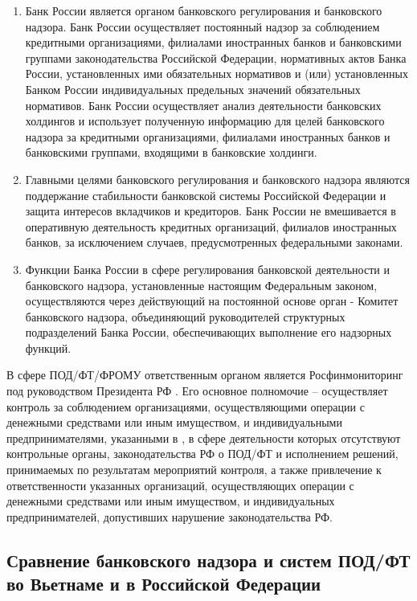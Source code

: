 \documentclass{article}
\begin{document}
\begin{enumerate}
  \item Банк России является органом банковского регулирования и банковского надзора. Банк России осуществляет постоянный надзор за соблюдением кредитными организациями, филиалами иностранных банков и банковскими группами законодательства Российской Федерации, нормативных актов Банка России, установленных ими обязательных нормативов и (или) установленных Банком России индивидуальных предельных значений обязательных нормативов. Банк России осуществляет анализ деятельности банковских холдингов и использует полученную информацию для целей банковского надзора за кредитными организациями, филиалами иностранных банков и банковскими группами, входящими в банковские холдинги.
  \item Главными целями банковского регулирования и банковского надзора являются поддержание стабильности банковской системы Российской Федерации и защита интересов вкладчиков и кредиторов. Банк России не вмешивается в оперативную деятельность кредитных организаций, филиалов иностранных банков, за исключением случаев, предусмотренных федеральными законами.
  \item Функции Банка России в сфере регулирования банковской деятельности и банковского надзора, установленные настоящим Федеральным законом, осуществляются через действующий на постоянной основе орган - Комитет банковского надзора, объединяющий руководителей структурных подразделений Банка России, обеспечивающих выполнение его надзорных функций.
\end{enumerate}

В сфере ПОД/ФТ/ФРОМУ ответственным органом является Росфинмониторинг под руководством Президента РФ \cite{pre808}. Его основное полномочие -- осуществляет контроль за соблюдением организациями, осуществляющими операции с денежными средствами или иным имуществом, и индивидуальными предпринимателями, указанными в \cite{fz115}, в сфере деятельности которых отсутствуют контрольные органы, законодательства РФ о ПОД/ФТ и исполнением решений, принимаемых по результатам мероприятий контроля, а также привлечение к ответственности указанных организаций, осуществляющих операции с денежными средствами или иным имуществом, и индивидуальных предпринимателей, допустивших нарушение законодательства РФ.

\hfill

\subsection{Сравнение банковского надзора и систем ПОД/ФТ во Вьетнаме и в Российской Федерации}
\end{document}
